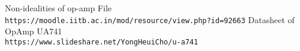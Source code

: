 \documentclass[12pt]{article}
\begin{document}
        \newpage
        
        \vspace*{5cm}
    \begin{thebibliography}{9}

        Non-idealities of op-amp File 
        \\\texttt{https://moodle.iitb.ac.in/mod/resource/view.php?id=92663}
        Datasheet of OpAmp UA741
        \\\texttt{https://www.slideshare.net/YongHeuiCho/u-a741}
        
    \end{thebibliography}
     
  
\end{document}
